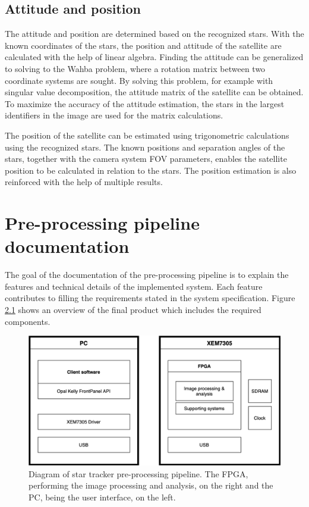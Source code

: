 \documentclass[12pt]{report}
\begin{document}
\section{Attitude and position}
The attitude and position are determined based on the recognized stars. With the known coordinates of the stars, the position and attitude of the satellite are calculated with the help of linear algebra. Finding the attitude can be generalized to solving to the Wahba problem, where a rotation matrix between two coordinate systems are sought. By solving this problem, for example with singular value decomposition, the attitude matrix of the satellite can be obtained. To maximize the accuracy of the attitude estimation, the stars in the largest identifiers in the image are used for the matrix calculations.\citep*{StRef} \citep*{StreakDet}
\par
The position of the satellite can be estimated using trigonometric calculations using the recognized stars. The known positions and separation angles of the stars, together with the camera system FOV parameters, enables the satellite position to be calculated in relation to the stars. The position estimation is also reinforced with the help of multiple results. \citep*{StDev}

\chapter{Pre-processing pipeline documentation}

The goal of the documentation of the pre-processing pipeline is to explain the features and technical details of the implemented system. Each feature contributes to filling the requirements stated in the system specification. Figure \ref{fig:overview} shows an overview of the final product which includes the required components.

\begin{figure}[h]
    \centering
    \includegraphics[scale=0.3]{figures/overview.png}
    \caption{Diagram of star tracker pre-processing pipeline. The FPGA, performing the image processing and analysis, on the right and the PC, being the user interface, on the left.}
    \label{fig:overview}
\end{figure}
\end{document}
